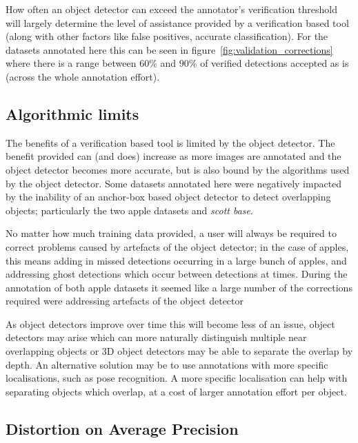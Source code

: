 How often an object detector can exceed the annotator's verification threshold will largely determine the level of assistance provided by a verification based tool (along with other factors like false positives, accurate classification). For the datasets annotated here this can be seen in figure~\ref{fig:validation_corrections} where there is a range between $60\%$ and $90\%$ of verified detections accepted as is (across the whole annotation effort). 

\subsection{Algorithmic limits}
\label{sec:machine_limits}

The benefits of a verification based tool is limited by the object detector. The benefit provided can (and does) increase as more images are annotated and the object detector becomes more accurate, but is also bound by the algorithms used by the object detector. Some datasets annotated here were negatively impacted by the inability of an anchor-box based object detector to detect overlapping objects; particularly the two apple datasets and \emph{scott base}. 

No matter how much training data provided, a user will always be required to correct problems caused by artefacts of the object detector; in the case of apples, this means adding in missed detections occurring in a large bunch of apples, and addressing ghost detections which occur between detections at times. During the annotation of both apple datasets it seemed like a large number of the corrections required were addressing artefacts of the object detector

As object detectors improve over time this will become less of an issue, object detectors may arise which can more naturally distinguish multiple near overlapping objects or 3D object detectors may be able to separate the overlap by depth. An alternative solution may be to use annotations with more specific localisations, such as pose recognition. A more specific localisation can help with separating objects which overlap, at a cost of larger annotation effort per object.


\subsection{Distortion on Average Precision}
\label{sec:localisation_precision}

